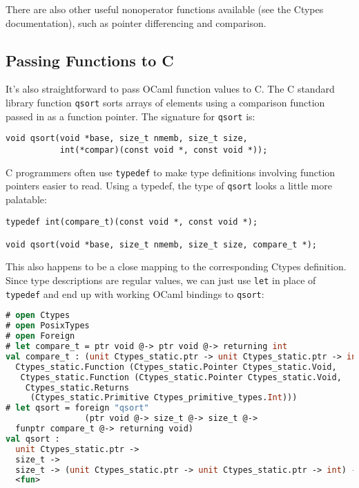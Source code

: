 There are also other useful nonoperator functions available (see the
Ctypes documentation), such as pointer differencing and comparison.

\hypertarget{passing-functions-to-c}{%
\subsection{Passing Functions to C}\label{passing-functions-to-c}}

It's also straightforward to pass OCaml function values to C. The C
standard library function \passthrough{\lstinline!qsort!} sorts arrays
of elements using a comparison function passed in as a function pointer.
The signature for \passthrough{\lstinline!qsort!}
is:

\begin{lstlisting}
void qsort(void *base, size_t nmemb, size_t size,
           int(*compar)(const void *, const void *));
\end{lstlisting}

C programmers often use \passthrough{\lstinline!typedef!} to make type
definitions involving function pointers easier to read. Using a typedef,
the type of \passthrough{\lstinline!qsort!} looks a little more
palatable:

\begin{lstlisting}
typedef int(compare_t)(const void *, const void *);

void qsort(void *base, size_t nmemb, size_t size, compare_t *);
\end{lstlisting}

This also happens to be a close mapping to the corresponding Ctypes
definition. Since type descriptions are regular values, we can just use
\passthrough{\lstinline!let!} in place of
\passthrough{\lstinline!typedef!} and end up with working OCaml bindings
to \passthrough{\lstinline!qsort!}:

\begin{lstlisting}[language=Caml]
# open Ctypes
# open PosixTypes
# open Foreign
# let compare_t = ptr void @-> ptr void @-> returning int
val compare_t : (unit Ctypes_static.ptr -> unit Ctypes_static.ptr -> int) fn =
  Ctypes_static.Function (Ctypes_static.Pointer Ctypes_static.Void,
   Ctypes_static.Function (Ctypes_static.Pointer Ctypes_static.Void,
    Ctypes_static.Returns
     (Ctypes_static.Primitive Ctypes_primitive_types.Int)))
# let qsort = foreign "qsort"
                (ptr void @-> size_t @-> size_t @->
  funptr compare_t @-> returning void)
val qsort :
  unit Ctypes_static.ptr ->
  size_t ->
  size_t -> (unit Ctypes_static.ptr -> unit Ctypes_static.ptr -> int) -> unit =
  <fun>
\end{lstlisting}

